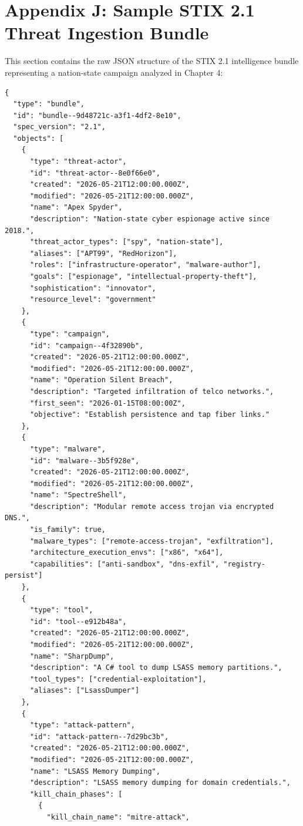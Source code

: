 \section*{Appendix J: Sample STIX 2.1 Threat Ingestion Bundle}
This section contains the raw JSON structure of the STIX 2.1 intelligence bundle representing a nation-state campaign analyzed in Chapter 4:
\begin{verbatim}
{
  "type": "bundle",
  "id": "bundle--9d48721c-a3f1-4df2-8e10",
  "spec_version": "2.1",
  "objects": [
    {
      "type": "threat-actor",
      "id": "threat-actor--8e0f66e0",
      "created": "2026-05-21T12:00:00.000Z",
      "modified": "2026-05-21T12:00:00.000Z",
      "name": "Apex Spyder",
      "description": "Nation-state cyber espionage active since 2018.",
      "threat_actor_types": ["spy", "nation-state"],
      "aliases": ["APT99", "RedHorizon"],
      "roles": ["infrastructure-operator", "malware-author"],
      "goals": ["espionage", "intellectual-property-theft"],
      "sophistication": "innovator",
      "resource_level": "government"
    },
    {
      "type": "campaign",
      "id": "campaign--4f32890b",
      "created": "2026-05-21T12:00:00.000Z",
      "modified": "2026-05-21T12:00:00.000Z",
      "name": "Operation Silent Breach",
      "description": "Targeted infiltration of telco networks.",
      "first_seen": "2026-01-15T08:00:00Z",
      "objective": "Establish persistence and tap fiber links."
    },
    {
      "type": "malware",
      "id": "malware--3b5f928e",
      "created": "2026-05-21T12:00:00.000Z",
      "modified": "2026-05-21T12:00:00.000Z",
      "name": "SpectreShell",
      "description": "Modular remote access trojan via encrypted DNS.",
      "is_family": true,
      "malware_types": ["remote-access-trojan", "exfiltration"],
      "architecture_execution_envs": ["x86", "x64"],
      "capabilities": ["anti-sandbox", "dns-exfil", "registry-persist"]
    },
    {
      "type": "tool",
      "id": "tool--e912b48a",
      "created": "2026-05-21T12:00:00.000Z",
      "modified": "2026-05-21T12:00:00.000Z",
      "name": "SharpDump",
      "description": "A C# tool to dump LSASS memory partitions.",
      "tool_types": ["credential-exploitation"],
      "aliases": ["LsassDumper"]
    },
    {
      "type": "attack-pattern",
      "id": "attack-pattern--7d29bc3b",
      "created": "2026-05-21T12:00:00.000Z",
      "modified": "2026-05-21T12:00:00.000Z",
      "name": "LSASS Memory Dumping",
      "description": "LSASS memory dumping for domain credentials.",
      "kill_chain_phases": [
        {
          "kill_chain_name": "mitre-attack",

\end{verbatim}

